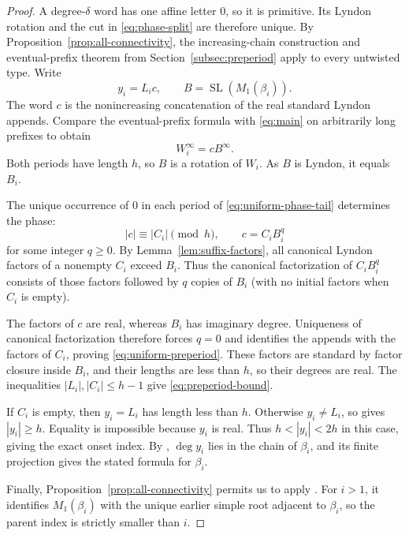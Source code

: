 \documentclass[11pt]{amsart}
\numberwithin{equation}{section}
\theoremstyle{definition}
\DeclareMathOperator{\SL}{SL}
\begin{document}
\begin{proof}
A degree-$\delta$ word has one affine letter $0$, so it is primitive. Its Lyndon rotation and the cut in \eqref{eq:phase-split} are therefore unique. By Proposition~\ref{prop:all-connectivity}, the increasing-chain construction and eventual-prefix theorem from Section~\ref{subsec:preperiod} apply to every untwisted type. Write
\[
 y_i=L_ic,\qquad B=\SL(M_1(\beta_i)).
\]
The word $c$ is the nonincreasing concatenation of the real standard Lyndon appends. Compare the eventual-prefix formula \cite[Lemma~6.45]{ETC} with \eqref{eq:main} on arbitrarily long prefixes to obtain
\begin{equation}\label{eq:uniform-phase-tail}
 W_i^\infty=cB^\infty.
\end{equation}
Both periods have length $h$, so $B$ is a rotation of $W_i$. As $B$ is Lyndon, it equals $B_i$.

The unique occurrence of $0$ in each period of \eqref{eq:uniform-phase-tail} determines the phase:
\[
 |c|\equiv |C_i|\pmod h,\qquad c=C_iB_i^q
\]
for some integer $q\geq0$. By Lemma~\ref{lem:suffix-factors}, all canonical Lyndon factors of a nonempty $C_i$ exceed $B_i$. Thus the canonical factorization of $C_iB_i^q$ consists of those factors followed by $q$ copies of $B_i$ (with no initial factors when $C_i$ is empty).

The factors of $c$ are real, whereas $B_i$ has imaginary degree. Uniqueness of canonical factorization therefore forces $q=0$ and identifies the appends with the factors of $C_i$, proving \eqref{eq:uniform-preperiod}. These factors are standard by factor closure inside $B_i$, and their lengths are less than $h$, so their degrees are real. The inequalities $|L_i|,|C_i|\leq h-1$ give \eqref{eq:preperiod-bound}.

If $C_i$ is empty, then $y_i=L_i$ has length less than $h$. Otherwise $y_i\ne L_i$, so \cite[Corollary~6.15]{ETC} gives $|y_i|\geq h$. Equality is impossible because $y_i$ is real. Thus $h<|y_i|<2h$ in this case, giving the exact onset index. By \cite[Lemma~6.11]{ETC}, $\deg y_i$ lies in the chain of $\beta_i$, and its finite projection gives the stated formula for $\beta_i$.

Finally, Proposition~\ref{prop:all-connectivity} permits us to apply \cite[Lemma~4.32]{ETC}. For $i>1$, it identifies $M_1(\beta_i)$ with the unique earlier simple root adjacent to $\beta_i$, so the parent index is strictly smaller than $i$.
\end{proof}
\end{document}
